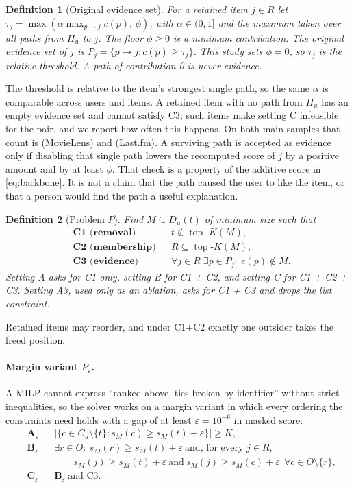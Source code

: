 \documentclass[11pt]{article}
\newtheorem{definition}{Definition}
\newcommand{\topk}{\operatorname{top}\text{-}K}
\newcommand{\Peps}{P_\varepsilon}
\begin{document}
\begin{definition}[Original evidence set]
For a retained item $j\in R$ let $\tau_{j}=\max(\alpha\max_{p\to j}c(p),\,\phi)$, with $\alpha\in(0,1]$ and the
maximum taken over all paths from $H_u$ to $j$. The floor $\phi\ge 0$ is a minimum contribution. The original
evidence set of $j$ is $P_j=\{p\to j: c(p)\ge\tau_j\}$. This study sets $\phi=0$, so $\tau_j$ is the relative
threshold. A path of contribution 0 is never evidence.
\end{definition}

The threshold is relative to the item's strongest single path, so the same $\alpha$ is comparable across users and
items. A retained item with no path from $H_u$ has an empty evidence set and cannot satisfy C3; such items make
setting C infeasible for the pair, and we report how often this happens. On both main samples that count is
\MLEvFree{} (MovieLens) and \LFEvFree{} (Last.fm). A surviving path is accepted as evidence only if disabling that
single path lowers the recomputed score of $j$ by a positive amount and by at least $\phi$. That check is a
property of the additive score in \eqref{eq:backbone}. It is not a claim that the path caused the user to like the
item, or that a person would find the path a useful explanation.

\begin{definition}[Problem $P$]
Find $M\subseteq D_u(t)$ of minimum size such that
\begin{align*}
&\textbf{C1 (removal)} && t\notin\topk(M),\\
&\textbf{C2 (membership)} && R\subseteq\topk(M),\\
&\textbf{C3 (evidence)} && \forall j\in R\;\exists p\in P_j:\ e(p)\notin M.
\end{align*}
Setting A asks for C1 only, setting B for C1 + C2, and setting C for C1 + C2 + C3. Setting A3, used only as an
ablation, asks for C1 + C3 and drops the list constraint.
\end{definition}

Retained items may reorder, and under C1+C2 exactly one outsider takes the freed position.

\paragraph{Margin variant $\Peps$.} A MILP cannot express ``ranked above, ties broken by identifier'' without strict
inequalities, so the solver works on a margin variant in which every ordering the constraints need holds with a gap of
at least $\varepsilon=10^{-6}$ in masked score:
\begin{align*}
&\textbf{A}_\varepsilon && \bigl|\{c\in C_u\setminus\{t\}: s_M(c)\ge s_M(t)+\varepsilon\}\bigr|\ge K,\\
&\textbf{B}_\varepsilon && \exists r\in O:\ s_M(r)\ge s_M(t)+\varepsilon\ \text{and, for every } j\in R,\\
& && \qquad s_M(j)\ge s_M(t)+\varepsilon\ \text{and}\ s_M(j)\ge s_M(c)+\varepsilon\ \ \forall c\in O\setminus\{r\},\\
&\textbf{C}_\varepsilon && \textbf{B}_\varepsilon\ \text{and C3}.
\end{align*}
\end{document}
